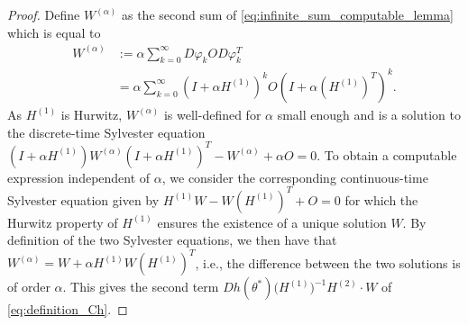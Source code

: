 \documentclass{article}
\begin{document}
\begin{proof}
    Define $W^{(\alpha)}$ as the second sum of \eqref{eq:infinite_sum_computable_lemma} which is equal to
    \begin{align*}
        W^{(\alpha)} &:= \alpha\sum_{k=0}^\infty D \varphi_k O D \varphi_k^T \\
        &= \alpha\sum_{k=0}^\infty (I +\alpha H^{(1)})^k O (I +\alpha (H^{(1)})^T)^k.
    \end{align*}
    As $H^{(1)}$ is Hurwitz, $W^{(\alpha)}$ is well-defined for $\alpha$ small enough and is a solution to the discrete-time Sylvester equation $(I + \alpha H^{(1)})W^{(\alpha)}(I + \alpha H^{(1)})^T - W^{(\alpha)} + \alpha O= 0$. To obtain a computable expression independent of $\alpha$, we consider the corresponding continuous-time Sylvester equation given by $H^{(1)}W - W(H^{(1)})^T + O= 0$ for which the Hurwitz property of $H^{(1)}$ ensures the existence of a unique solution $W$. By definition of the two Sylvester equations, we then have that $W^{(\alpha)} =  W + \alpha H^{(1)}W (H^{(1)})^T$, i.e., the difference between the two solutions is of order $\alpha$. This gives the second term $D h(\theta^*) \bigl(H^{(1)}\bigr)^{-1} H^{(2)} \cdot W$ of \eqref{eq:definition_Ch}.
    

\end{proof}
\end{document}

